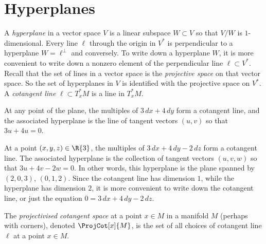 \section{Hyperplanes}
A \emph{hyperplane} in a vector space \(V\) is a linear subspace \(W \subset V\) so that \(V/W\) is \(1\)-dimensional.
Every line \(\ell\) through the origin in \(V^*\) is perpendicular to a hyperplane \(W=\ell^{\perp}\) and conversely.
To write down a hyperplane \(W\), it is more convenient to write down a nonzero element of the perpendicular line  \(\ell \subset V^*\).
Recall that the set of lines in a vector space is the \emph{projective space} on that vector space.
So the set of hyperplanes in \(V\) is identified with the projective space on \(V^*\).
A \emph{cotangent line} \(\ell \subset T^*_x M\) is a line in \(T^*_x M\).
\begin{example}
At any point of the plane, the multiples of \(3 \, dx + 4 \, dy\) form a cotangent line, and the associated hyperplane is the line of tangent vectors \((u,v)\) so that \(3u+4u=0\).
\end{example}
\begin{example}
At a point \((x,y,z) \in \R{3}\), the multiples of \(3 \, dx + 4 \, dy -2 \, dz\) form a cotangent line.
The associated hyperplane is the collection of tangent vectors \((u,v,w)\) so that \(3u+4v-2w=0\).
In other words, this hyperplane is the plane spanned by \((2,0,3)\), \((0,1,2)\).
Since the cotangent line has dimension \(1\), while the hyperplane has dimension \(2\), it is more convenient to write down the cotangent line, or just the equation \(0=3 \, dx + 4 \, dy -2 \, dz\).
\end{example}
The \emph{projectivised cotangent space} at a point \(x \in M\) in a manifold \(M\) (perhaps with corners), denoted \(\ProjCot[x]{M}\), is the set of all choices of cotangent line \(\ell\) at a point \(x \in M\).


